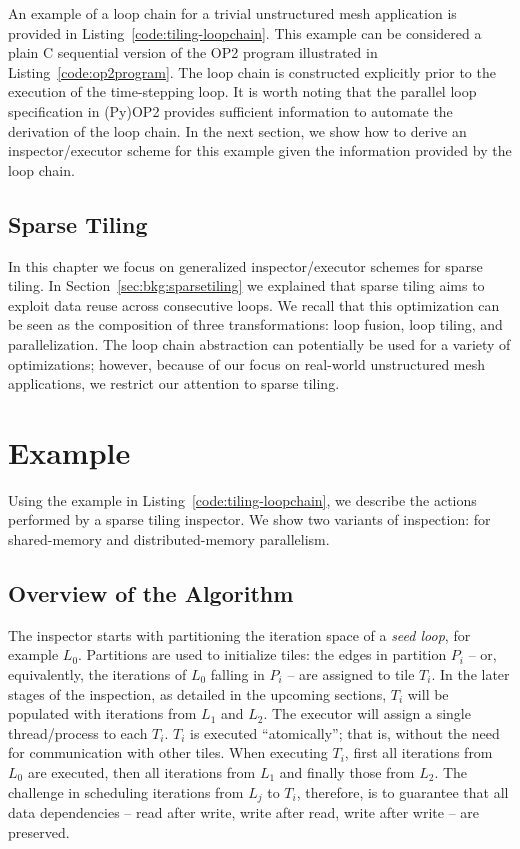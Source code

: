 An example of a loop chain for a trivial unstructured mesh application is provided in Listing~\ref{code:tiling-loopchain}. This example can be considered a plain C sequential version of the OP2 program illustrated in Listing~\ref{code:op2program}. The loop chain is constructed explicitly prior to the execution of the time-stepping loop. It is worth noting that the parallel loop specification in (Py)OP2 provides sufficient information to automate the derivation of the loop chain. In the next section, we show how to derive an inspector/executor scheme for this example given the information provided by the loop chain.

\subsection{Sparse Tiling}
In this chapter we focus on generalized inspector/executor schemes for sparse tiling. In Section~\ref{sec:bkg:sparsetiling} we explained that sparse tiling aims to exploit data reuse across consecutive loops. We recall that this optimization can be seen as the composition of three transformations: loop fusion, loop tiling, and parallelization. The loop chain abstraction can potentially be used for a variety of optimizations; however, because of our focus on real-world unstructured mesh applications, we restrict our attention to sparse tiling.

\section{Example}
Using the example in Listing~\ref{code:tiling-loopchain}, we describe the actions performed by a sparse tiling inspector. We show two variants of inspection: for shared-memory and distributed-memory parallelism. 

\subsection{Overview of the Algorithm}
The inspector starts with partitioning the iteration space of a \textit{seed loop}, for example $L_0$. Partitions are used to initialize tiles: the edges in partition $P_i$ -- or, equivalently, the iterations of $L_0$ falling in $P_i$ -- are assigned to tile $T_i$. In the later stages of the inspection,  as detailed in the upcoming sections, $T_i$ will be populated with iterations from $L_1$ and $L_2$. The executor will assign a single thread/process to each $T_i$. $T_i$ is executed ``atomically''; that is, without the need for communication with other tiles. When executing $T_i$, first all iterations from $L_0$ are executed, then all iterations from $L_1$ and finally those from $L_2$. The challenge in scheduling iterations from $L_j$ to $T_i$, therefore, is to guarantee that all data dependencies -- read after write, write after read, write after write -- are preserved. 

